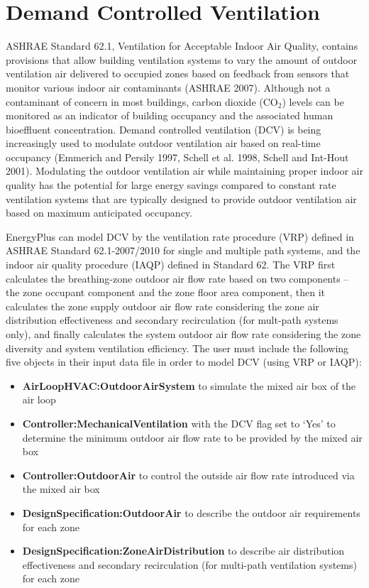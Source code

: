 \section{Demand Controlled Ventilation }\label{demand-controlled-ventilation}

ASHRAE Standard 62.1, Ventilation for Acceptable Indoor Air Quality, contains provisions that allow building ventilation systems to vary the amount of outdoor ventilation air delivered to occupied zones based on feedback from sensors that monitor various indoor air contaminants (ASHRAE 2007). Although not a contaminant of concern in most buildings, carbon dioxide (CO\(_{2}\)) levels can be monitored as an indicator of building occupancy and the associated human bioeffluent concentration. Demand controlled ventilation (DCV) is being increasingly used to modulate outdoor ventilation air based on real-time occupancy (Emmerich and Persily 1997, Schell et al. 1998, Schell and Int-Hout 2001). Modulating the outdoor ventilation air while maintaining proper indoor air quality has the potential for large energy savings compared to constant rate ventilation systems that are typically designed to provide outdoor ventilation air based on maximum anticipated occupancy.

EnergyPlus can model DCV by the ventilation rate procedure (VRP) defined in ASHRAE Standard 62.1-2007/2010 for single and multiple path systems, and the indoor air quality procedure (IAQP) defined in Standard 62. The VRP first calculates the breathing-zone outdoor air flow rate based on two components -- the zone occupant component and the zone floor area component, then it calculates the zone supply outdoor air flow rate considering the zone air distribution effectiveness and secondary recirculation (for mult-path systems only), and finally calculates the system outdoor air flow rate considering the zone diversity and system ventilation efficiency. The user must include the following five objects in their input data file in order to model DCV (using VRP or IAQP):

\begin{itemize}
  \item \textbf{AirLoopHVAC:OutdoorAirSystem} to simulate the mixed air box of the air loop
  \item \textbf{Controller:MechanicalVentilation} with the DCV flag set to `Yes' to determine the minimum outdoor air flow rate to be provided by the mixed air box
  \item \textbf{Controller:OutdoorAir} to control the outside air flow rate introduced via the mixed air box
  \item \textbf{DesignSpecification:OutdoorAir} to describe the outdoor air requirements for each zone
  \item \textbf{DesignSpecification:ZoneAirDistribution} to describe air distribution effectiveness and secondary recirculation (for multi-path ventilation systems) for each zone
\end{itemize}

